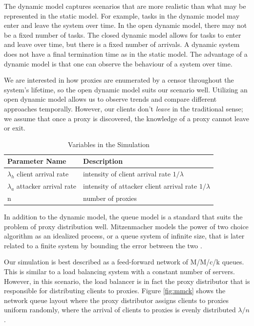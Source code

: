 The dynamic model captures scenarios that are more realistic than what may be represented in the static model. For example, tasks in the dynamic model may enter and leave the system over time. In the open dynamic model, there may not be a fixed number of tasks. The closed dynamic model allows for tasks to enter and leave over time, but there is a fixed number of arrivals. A dynamic system does not have a final termination time as in the static model. The advantage of a dynamic model is that one can observe the behaviour of a system over time.

We are interested in how proxies are enumerated by a censor throughout the system's lifetime, so the open dynamic model suits our scenario well. Utilizing an open dynamic model allows us to observe trends and compare different approaches temporally. However, our clients don't \textit{leave} in the traditional sense; we assume that once a proxy is discovered, the knowledge of a proxy cannot leave or exit. 

\begin{table}[h]
  \centering
	\begin{tabular}{ll}
	\hline
	\cline{1-2}
	Parameter Name   & Description  \\
	\hline
    $\lambda_h $ client arrival rate & intensity of client arrival rate $1/\lambda$ \\
	$\lambda_a$ attacker arrival rate  & intensity of attacker client arrival rate $1/ \lambda$\\
	n     & number of proxies \\
	\hline
	\end{tabular}
  \caption{Variables in the Simulation}
  \label{tab:vars}
\end{table}

In addition to the dynamic model, the queue model is a standard that suits the problem of proxy distribution well. Mitzenmacher models the power of two choice algorithm as an idealized process, or a queue system of infinite size, that is later related to a finite system by bounding the error between the two \cite{mitzenmacher1996power}. 

Our simulation is best described as a feed-forward network of M/M/c/k queues. This is similar to a load balancing system with a constant number of servers. However, in this scenario, the load balancer is in fact the proxy distributor that is responsible for distributing clients to proxies. Figure \ref{fig:mmck} shows the network queue layout where the proxy distributor assigns clients to proxies uniform randomly, where the arrival of clients to proxies is evenly distributed $\lambda/n$. 

